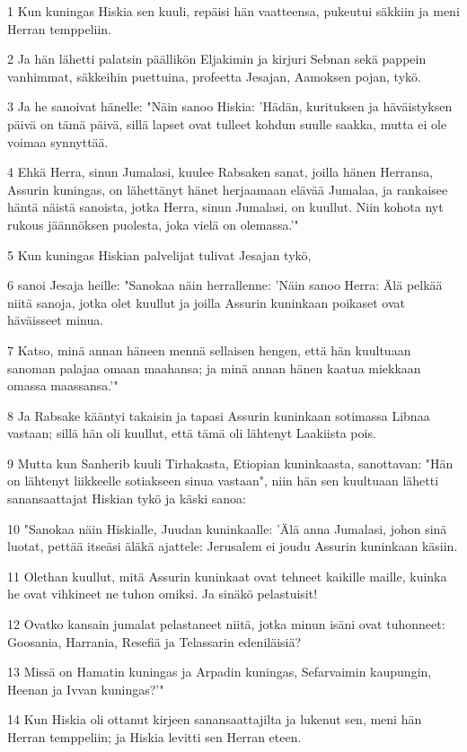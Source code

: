 \par 1 Kun kuningas Hiskia sen kuuli, repäisi hän vaatteensa, pukeutui säkkiin ja meni Herran temppeliin.
\par 2 Ja hän lähetti palatsin päällikön Eljakimin ja kirjuri Sebnan sekä pappein vanhimmat, säkkeihin puettuina, profeetta Jesajan, Aamoksen pojan, tykö.
\par 3 Ja he sanoivat hänelle: "Näin sanoo Hiskia: 'Hädän, kurituksen ja häväistyksen päivä on tämä päivä, sillä lapset ovat tulleet kohdun suulle saakka, mutta ei ole voimaa synnyttää.
\par 4 Ehkä Herra, sinun Jumalasi, kuulee Rabsaken sanat, joilla hänen Herransa, Assurin kuningas, on lähettänyt hänet herjaamaan elävää Jumalaa, ja rankaisee häntä näistä sanoista, jotka Herra, sinun Jumalasi, on kuullut. Niin kohota nyt rukous jäännöksen puolesta, joka vielä on olemassa.'"
\par 5 Kun kuningas Hiskian palvelijat tulivat Jesajan tykö,
\par 6 sanoi Jesaja heille: "Sanokaa näin herrallenne: 'Näin sanoo Herra: Älä pelkää niitä sanoja, jotka olet kuullut ja joilla Assurin kuninkaan poikaset ovat häväisseet minua.
\par 7 Katso, minä annan häneen mennä sellaisen hengen, että hän kuultuaan sanoman palajaa omaan maahansa; ja minä annan hänen kaatua miekkaan omassa maassansa.'"
\par 8 Ja Rabsake kääntyi takaisin ja tapasi Assurin kuninkaan sotimassa Libnaa vastaan; sillä hän oli kuullut, että tämä oli lähtenyt Laakiista pois.
\par 9 Mutta kun Sanherib kuuli Tirhakasta, Etiopian kuninkaasta, sanottavan: "Hän on lähtenyt liikkeelle sotiakseen sinua vastaan", niin hän sen kuultuaan lähetti sanansaattajat Hiskian tykö ja käski sanoa:
\par 10 "Sanokaa näin Hiskialle, Juudan kuninkaalle: 'Älä anna Jumalasi, johon sinä luotat, pettää itseäsi äläkä ajattele: Jerusalem ei joudu Assurin kuninkaan käsiin.
\par 11 Olethan kuullut, mitä Assurin kuninkaat ovat tehneet kaikille maille, kuinka he ovat vihkineet ne tuhon omiksi. Ja sinäkö pelastuisit!
\par 12 Ovatko kansain jumalat pelastaneet niitä, jotka minun isäni ovat tuhonneet: Goosania, Harrania, Resefiä ja Telassarin edeniläisiä?
\par 13 Missä on Hamatin kuningas ja Arpadin kuningas, Sefarvaimin kaupungin, Heenan ja Ivvan kuningas?'"
\par 14 Kun Hiskia oli ottanut kirjeen sanansaattajilta ja lukenut sen, meni hän Herran temppeliin; ja Hiskia levitti sen Herran eteen.

